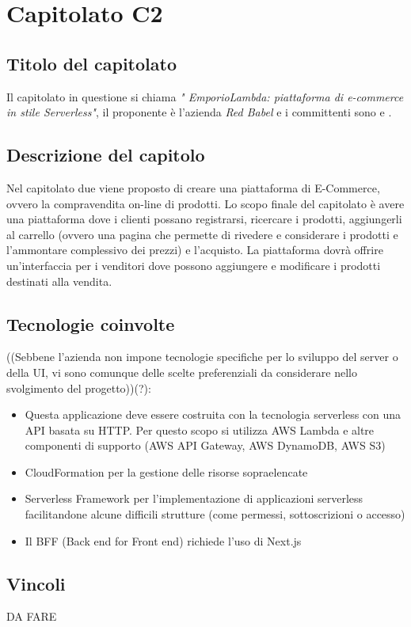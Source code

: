 \section{Capitolato C2}
\subsection{Titolo del capitolato}
Il capitolato in questione si chiama \textit{" 	EmporioLambda: piattaforma di e-commerce in stile Serverless"}, il proponente \`e l'azienda \textit{Red Babel} e i committenti sono \VT{} e \CR{}.

\subsection{Descrizione del capitolo}
Nel capitolato due viene proposto di creare una piattaforma di E-Commerce, ovvero la compravendita on-line di prodotti.
Lo scopo finale del capitolato è avere una piattaforma dove i clienti possano registrarsi, ricercare i prodotti, aggiungerli al carrello (ovvero una pagina che permette di rivedere e considerare i prodotti e l'ammontare complessivo dei prezzi) e l'acquisto. La piattaforma dovrà offrire un'interfaccia per i venditori dove possono aggiungere e modificare i prodotti destinati alla vendita.

\subsection{Tecnologie coinvolte}
((Sebbene l'azienda non impone tecnologie specifiche per lo sviluppo del server o della UI, vi sono comunque delle scelte preferenziali da considerare nello svolgimento del progetto))(?):
\begin{itemize}
\item	Questa applicazione deve essere costruita con la tecnologia serverless con una API basata su HTTP. Per questo scopo si utilizza AWS Lambda e altre componenti di supporto (AWS API Gateway, AWS DynamoDB, AWS S3)
\item	CloudFormation per la gestione delle risorse sopraelencate
\item	Serverless Framework per l’implementazione di applicazioni serverless facilitandone alcune difficili strutture (come permessi, sottoscrizioni o accesso)
\item	Il BFF (Back end for Front end) richiede l’uso di Next.js
\end{itemize}

\subsection{Vincoli}
DA FARE
